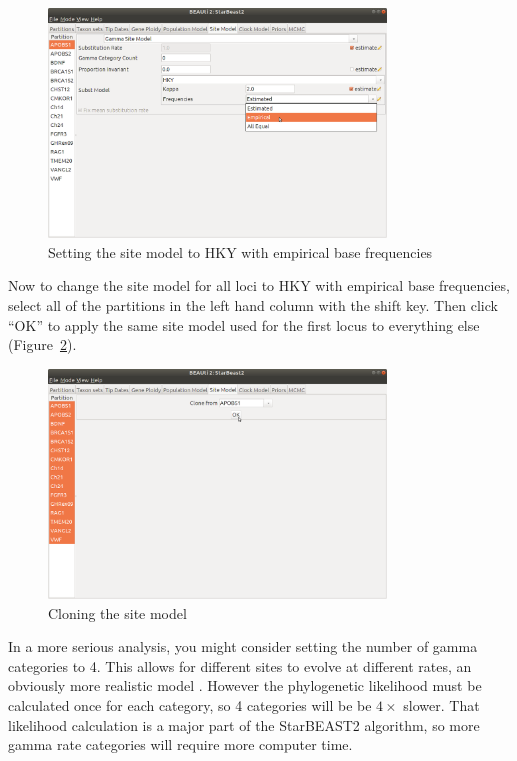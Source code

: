 \documentclass[12pt]{article}
\begin{document}
\begin{figure}[htb!]
\centering
\includegraphics[width=0.8\textwidth]{figures/hky.png}
\caption
{Setting the site model to HKY with empirical base frequencies}
\label{fig:hky}
\end{figure}

Now to change the site model for all loci to HKY with empirical base frequencies,
select all of the partitions in the left hand column with the shift key. Then
click ``OK'' to apply the same site model used for the first locus
to everything else (Figure~\ref{fig:cloneSiteModel}).

\newpage{}

\begin{figure}[htb!]
\centering
\includegraphics[width=0.8\textwidth]{figures/cloneSiteModel.png}
\caption
{Cloning the site model}
\label{fig:cloneSiteModel}
\end{figure}

In a more serious analysis, you might consider setting the number of gamma
categories to 4. This allows for different sites to evolve at
different rates, an obviously more realistic model \parencite{Yang1994}. However
the phylogenetic likelihood must be calculated once for each category, so 4
categories will be be $4\times$ slower. That likelihood calculation is a major
part of the StarBEAST2 algorithm, so more gamma rate categories will require
more computer time.
\end{document}
